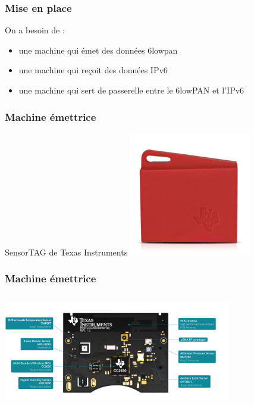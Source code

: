 \documentclass{smilebeamer}
\begin{document}

\begin{frame}
\frametitle{Mise en place}

On a besoin de : 

\begin{itemize}
\item une machine qui émet des données 6lowpan
\item une machine qui reçoit des données IPv6
\item une machine qui sert de passerelle entre le 6lowPAN et l'IPv6
\end{itemize}
\end{frame}

\begin{frame}
\frametitle{Machine émettrice}
\begin{center}
SensorTAG de Texas Instruments
\includegraphics{img/sensortag.png}


\end{center}
\end{frame}

\begin{frame}
\frametitle{Machine émettrice}
\begin{center}

\includegraphics[width=10cm,height=5cm]{img/sensortag-teardown.png}


\end{center}
\end{frame}
\end{document}
